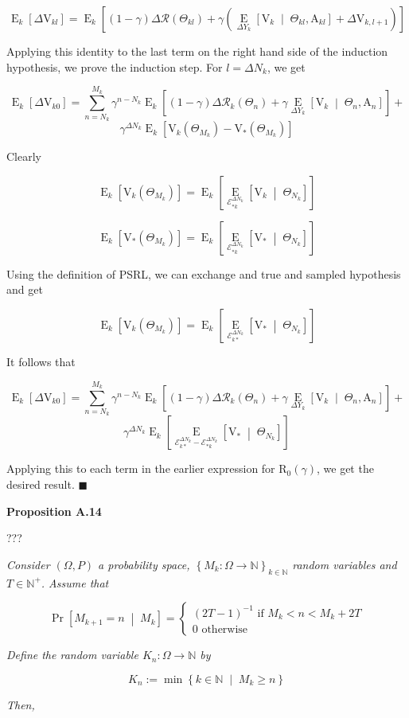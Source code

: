 \documentclass[a4paper]{article}
\newcommand{\Co}[1]{}
\newcommand{\AP}[1]{\left(#1\right)}
\newcommand{\AB}[1]{\left[#1\right]}
\newcommand{\AC}[1]{\left\{#1\right\}}
\newcommand{\ABM}[2]{\left[#1\;\middle\vert\;#2\right]}
\newcommand{\ACM}[2]{\left\{#1\;\middle\vert\;#2\right\}}
\newcommand{\CP}[3]{\underset{#1}{\operatorname{Pr}}\ABM{#2}{#3}}
\newcommand{\CE}[3]{\underset{#1}{\operatorname{E}}\ABM{#2}{#3}}
\newcommand{\Nats}{\mathbb{N}}
\newcommand{\R}{\mathcal{R}}
\newcommand{\V}{\mathrm{V}}
\newcommand{\Reg}{\mathrm{R}}
\newcommand{\SHy}{Y}
\newcommand{\AT}{\mathrm{A}}
\newcommand{\Ev}{\mathcal{E}}
\newcommand{\ET}{N}
\newcommand{\IT}{M}
\newcommand{\TE}[1]{{\operatorname{E}_k}\AB{#1}}
\begin{document}
$$\TE{\Delta\V_{kl}}=\TE{(1-\gamma)\Delta\R\AP{\Theta_{kl}}+\gamma\AP{\CE{\Delta\SHy_k}{\V_k}{\Theta_{kl},\AT_{kl}}+\Delta\V_{k,l+1}}}$$

Applying this identity to the last term on the right hand side of the induction hypothesis, we prove the induction step. For $l=\Delta\ET_k$, we get

$$\TE{\Delta\V_{k0}}=\sum_{n=\ET_k}^{\IT_k}\gamma^{n-\ET_k}\TE{(1-\gamma)\Delta\R_k\AP{\Theta_n}+\gamma\CE{\Delta\SHy_k}{\V_{k}}{\Theta_n,\AT_n}}+$$
$$\gamma^{\Delta\ET_k}\TE{\V_k\AP{\Theta_{\IT_k}}-\V_*\AP{\Theta_{\IT_k}}}$$

Clearly

$$\TE{\V_k\AP{\Theta_{\IT_k}}}=\TE{\CE{\Ev_{*k}^{\Delta\ET_k}}{\V_k}{\Theta_{\ET_k}}}$$

$$\TE{\V_*\AP{\Theta_{\IT_k}}}=\TE{\CE{\Ev_{*k}^{\Delta\ET_k}}{\V_*}{\Theta_{\ET_k}}}$$

Using the definition of PSRL, we can exchange and true and sampled hypothesis and get

$$\TE{\V_k\AP{\Theta_{\IT_k}}}=\TE{\CE{\Ev_{k*}^{\Delta\ET_k}}{\V_*}{\Theta_{\ET_k}}}$$

It follows that

$$\TE{\Delta\V_{k0}}=\sum_{n=\ET_k}^{\IT_k}\gamma^{n-\ET_k}\TE{(1-\gamma)\Delta\R_k\AP{\Theta_n}+\gamma\CE{\Delta\SHy_k}{\V_{k}}{\Theta_n,\AT_n}}+$$
$$\gamma^{\Delta\ET_k}\TE{\CE{\Ev_{k*}^{\Delta\ET_k}-\Ev_{*k}^{\Delta\ET_k}}{\V_*}{\Theta_{\ET_k}}}$$

Applying this to each term in the earlier expression for $\Reg_0(\gamma)$, we get the desired result. $\blacksquare$

\textbf{Proposition A.14}\Co{b}

???

\textit{Consider $(\Omega,P)$ a probability space, $\AC{M_k:\Omega\rightarrow\Nats}_{k\in\Nats}$ random variables and $T\in\Nats^+$. Assume that}\Co{i}

$$\CP{}{M_{k+1}=n}{M_k}=\begin{cases} \AP{2T-1}^{-1} \text{ if } M_k < n < M_k+2T\\ 0 \text{ otherwise} \end{cases}$$

\textit{Define the random variable $K_n:\Omega\rightarrow\Nats$ by}\Co{i}

$$K_n:=\min\ACM{k\in\Nats}{M_k\geq n}$$

\textit{Then,}\Co{i}
\end{document}
